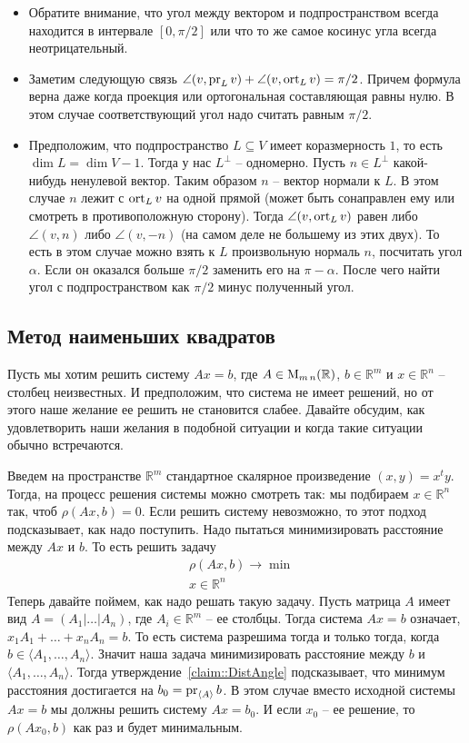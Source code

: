 \begin{itemize}
\item Обратите внимание, что угол между вектором и подпространством всегда находится в интервале $[0, \pi/2]$ или что то же самое косинус угла всегда неотрицательный.

\item Заметим следующую связь $\angle (v, \operatorname{pr}_L v) + \angle (v, \operatorname{ort}_L v) = \pi/2$.
Причем формула верна даже когда проекция или ортогональная составляющая равны нулю.
В этом случае соответствующий угол надо считать равным $\pi/2$.

\item Предположим, что подпространство $L\subseteq V$ имеет коразмерность $1$, то есть $\dim L = \dim V - 1$.
Тогда у нас $L^\bot$ -- одномерно.
Пусть $n\in L^\bot$ какой-нибудь ненулевой вектор.
Таким образом $n$ -- вектор нормали к $L$.
В этом случае $n$ лежит с $\operatorname{ort}_L v$ на одной прямой (может быть сонаправлен ему или смотреть в противоположную сторону).
Тогда $\angle (v, \operatorname{ort}_L v)$ равен либо $\angle (v, n)$ либо $\angle (v, - n)$ (на самом деле не большему из этих двух).
То есть в этом случае можно взять к $L$ произвольную нормаль $n$, посчитать угол $\alpha$.
Если он оказался больше $\pi/2$ заменить его на $\pi - \alpha$.
После чего найти угол с подпространством как $\pi/2$ минус полученный угол.
\end{itemize}


\subsection{Метод наименьших квадратов}

Пусть мы хотим решить систему $Ax = b$, где $A\in \operatorname{M}_{m\,n}(\mathbb R)$, $b\in \mathbb R^m$ и $x\in \mathbb R^n$ -- столбец неизвестных.
И предположим, что система не имеет решений, но от этого наше желание ее решить не становится слабее.
Давайте обсудим, как удовлетворить наши желания в подобной ситуации и когда такие ситуации обычно встречаются.

Введем на пространстве $\mathbb R^m$ стандартное скалярное произведение $(x,y) = x^t y$.
Тогда, на процесс решения системы можно смотреть так: мы подбираем $x\in \mathbb R^n$ так, чтоб $\rho(Ax, b) = 0$.
Если решить систему невозможно, то этот подход подсказывает, как надо поступить.
Надо пытаться минимизировать расстояние между $Ax$ и $b$.
То есть решить задачу
\[
\begin{aligned}
&\rho(Ax, b)\to \min\\
&x\in \mathbb R^n
\end{aligned}
\]
Теперь давайте поймем, как надо решать такую задачу.
Пусть матрица $A$ имеет вид $A = (A_1|\ldots|A_n)$, где $A_i\in \mathbb R^m$ -- ее столбцы.
Тогда система $Ax = b$ означает, $x_1A_1 + \ldots + x_n A_n = b$.
То есть система разрешима тогда и только тогда, когда $b\in \langle A_1,\ldots, A_n\rangle$.
Значит наша задача минимизировать расстояние между $b$ и $\langle A_1,\ldots,A_n\rangle$.
Тогда утверждение~\ref{claim::DistAngle} подсказывает, что минимум расстояния достигается на $b_0 = \operatorname{pr}_{\langle A\rangle}b$.
В этом случае вместо исходной системы $Ax = b$ мы должны решить систему $Ax = b_0$.
И если $x_0$ -- ее решение, то $\rho(Ax_0, b)$ как раз и будет минимальным.

